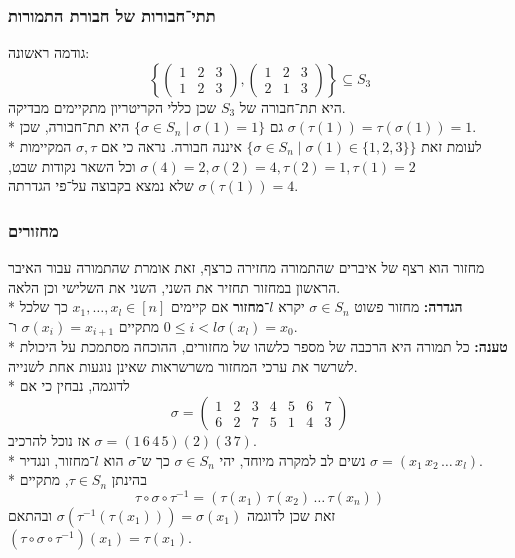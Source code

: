 \subsubsection{תתי־חבורות של חבורת התמורות}
גודמה ראשונה:
\[
	\left\{
		\begin{pmatrix}
			1 & 2 & 3 \\
			1 & 2 & 3
		\end{pmatrix},
		\begin{pmatrix}
			1 & 2 & 3 \\
			2 & 1 & 3
		\end{pmatrix}
	\right\}
	\subseteq S_3
\]
היא תת־חבורה של $S_3$ שכן כללי הקריטריון מתקיימים מבדיקה. \\*
גם $\{ \sigma \in S_n \mid \sigma(1) = 1 \}$ היא תת־חבורה, שכן $\sigma(\tau(1)) = \tau(\sigma(1)) = 1$. \\*
לעומת זאת $\{ \sigma \in S_n \mid \sigma(1) \in \{1, 2, 3\}\}$ איננה חבורה. נראה כי אם $\sigma, \tau$ המקיימות $\sigma(4) = 2, \sigma(2) = 4, \tau(2) = 1, \tau(1) = 2$
וכל השאר נקודות שבט, $\sigma(\tau(1)) = 4$ שלא נמצא בקבוצה על־פי הגדרתה.

\subsubsection{מחזורים}
מחזור הוא רצף של איברים שהתמורה מחזירה כרצף, זאת אומרת שהתמורה עבור האיבר הראשון במחזור תחזיר את השני, השני את השלישי וכן הלאה. \\*
\textbf{הגדרה:} מחזור פשוט $\sigma \in S_n$ יקרא \textbf{$l$־מחזור} אם קיימים $x_1, \hdots, x_l \in [n]$ כך שלכל $0 \le i < l$ מתקיים $\sigma(x_i) = x_{i + 1}$ ו־$\sigma(x_l) = x_0$. \\*
\textbf{טענה:} כל תמורה היא הרכבה של מספר כלשהו של מחזורים, ההוכחה מסתמכת על היכולת לשרשר את ערכי המחזור משרשראות שאינן נוגעות אחת לשנייה. \\*
לדוגמה, נבחין כי אם
\[
	\sigma = \begin{pmatrix}
		1 & 2 & 3 & 4 & 5 & 6 & 7 \\
		6 & 2 & 7 & 5 & 1 & 4 & 3
	\end{pmatrix}
\]
אז נוכל להרכיב $\sigma = (1 \, 6 \, 4 \, 5)(2)(3 \, 7)$. \\*
נשים לב למקרה מיוחד, יהי $\sigma \in S_n$ כך ש־$\sigma$ הוא $l$־מחזור, ונגדיר $\sigma = (x_1 \, x_2 \, \hdots \, x_l)$. \\*
בהינתן $\tau \in S_n$, מתקיים
\[
	\tau \circ \sigma \circ \tau^{-1} = (\tau(x_1) \, \tau(x_2) \, \hdots \, \tau(x_n))
\]
זאת שכן לדוגמה $\sigma(\tau^{-1}(\tau(x_1))) = \sigma(x_1)$ ובהתאם $(\tau \circ \sigma \circ \tau^{-1}) (x_1) = \tau(x_1)$.

